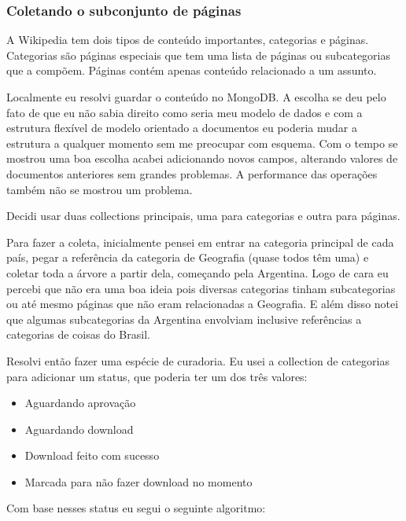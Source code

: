 \subsubsection{Coletando o subconjunto de páginas}

A Wikipedia tem dois tipos de conteúdo importantes, categorias e páginas. Categorias são páginas especiais que tem uma lista de páginas ou subcategorias que a compõem. Páginas contém apenas conteúdo relacionado a um assunto.

Localmente eu resolvi guardar o conteúdo no MongoDB. A escolha se deu pelo fato de que eu não sabia direito como seria meu modelo de dados e com a estrutura flexível de modelo orientado a documentos eu poderia mudar a estrutura a qualquer momento sem me preocupar com esquema. Com o tempo se mostrou uma boa escolha acabei adicionando novos campos, alterando valores de documentos anteriores sem grandes problemas. A performance das operações também não se mostrou um problema.

Decidi usar duas collections principais, uma para categorias e outra para páginas.

Para fazer a coleta, inicialmente pensei em entrar na categoria principal de cada país, pegar a referência da categoria de Geografia (quase todos têm uma) e coletar toda a árvore a partir dela, começando pela Argentina. Logo de cara eu percebi que não era uma boa ideia pois diversas categorias tinham subcategorias ou até mesmo páginas que não eram relacionadas a Geografia. E além disso notei que algumas subcategorias da Argentina envolviam inclusive referências a categorias de coisas do Brasil. 

Resolvi então fazer uma espécie de curadoria. Eu usei a collection de categorias para adicionar um status, que poderia ter um dos três valores:

\begin{itemize}
    \item Aguardando aprovação
    \item Aguardando download
    \item Download feito com sucesso
    \item Marcada para não fazer download no momento
\end{itemize}

Com base nesses status eu segui o seguinte algoritmo: 

